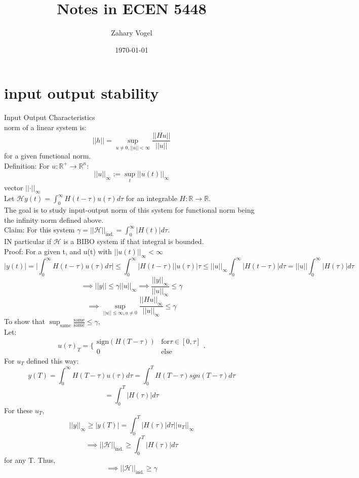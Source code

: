 \documentclass{article}
\author{Zahary Vogel}
\date{\today}
\title{Notes in ECEN 5448}
\begin{document}
\maketitle


\section{input output stability}
Input Output Characteristics\\
norm of a linear system is:\\
\[\lvert\lvert h\rvert\rvert=\sup_{u\neq 0,\lvert\lvert u\rvert\rvert<\infty}\frac{\lvert\lvert Hu\rvert\rvert}{\lvert\lvert u\rvert\rvert}\]
for a given functional norm.\\
Definition: For $u:\mathbb{R}^+\to\mathbb{R}^n$:
\[\lvert\lvert u\rvert\rvert_{\infty}:=\sup_t\lvert\lvert u(t)\rvert\rvert_{\infty}\]
vector $\lvert\lvert\cdot\rvert\rvert_{\infty}$\\
Let $\mathscr{H}$$y(t)=\int_0^{\infty}H(t-\tau)u(\tau)d\tau$ for an integrable $H:\mathbb{R}\to\mathbb{R}$.\\
The goal is to study input-output norm of this system for functional norm being the infinity norm defined above.\\
Claim: For this system $\gamma=\lvert\lvert \mathscr{H}\rvert\rvert_{\text{ind.}}=\int_0^\infty \lvert H(t)\rvert d\tau$.\\
IN particular if $\mathscr{H}$ is a BIBO system if that integral is bounded.\\

Proof: For a given t, and u(t) with $\lvert\lvert u(t)\rvert\rvert_{\infty}<\infty$
\[\lvert y(t)\rvert=\lvert\int_0^\infty H(t-\tau)u(\tau)d\tau\rvert\leq \int_0^\infty \lvert H(t-\tau)\rvert\lvert u(\tau)\rvert \tau\leq\lvert\lvert u\rvert\rvert_{\infty}\int_0^\infty \lvert H(t-\tau)\rvert d\tau =\lvert\lvert u\rvert\rvert\int_0^\infty \lvert H(\tau)\rvert d\tau\]
\[\implies \lvert\lvert y\rvert\rvert \leq \gamma\lvert\lvert u\rvert\rvert_{\infty}\implies \frac{\lvert\lvert y\rvert\rvert_{\infty}}{\lvert\lvert u\rvert\rvert_{\infty}}\leq\gamma\]
\[\implies \sup_{\lvert\lvert u\rvert\rvert\leq \infty,u\neq 0}\frac{\lvert\lvert H u\rvert\rvert_{\infty}}{\lvert\lvert u\rvert\rvert_{\infty}}\leq \gamma\]
To show that $\sup_{\text{same}}\frac{\text{same}}{\text{same}}\leq \gamma$,\\
Let:\\
\[u(\tau)_T=\{\begin{array}{ll}\text{sign}(H(T-\tau)) & \text{for} \tau\in[0,\tau]\\0 & \text{else}\end{array}.\]
For $u_T$ defined this way:\\
\[y(T)=\int_0^\infty H(T-\tau)u(\tau)d\tau=\int_0^T H(T-\tau)sgn(T-\tau)d\tau\]
\[=\int_0^T\lvert H(\tau)\rvert d\tau\]
For these $u_T$, \\
\[\lvert\lvert y\rvert\rvert_{\infty} \geq \lvert y(T)\rvert =\int_0^T\lvert H(\tau)\rvert d\tau\lvert\lvert u_T\rvert\rvert_{\infty}\]
\[\implies \lvert\lvert \mathscr{H}\rvert\rvert_{\text{ind.}}\geq \int_0^T \lvert H(\tau)\rvert d\tau\]
for any T. Thus,
\[\implies \lvert\lvert \mathscr{H}\rvert\rvert_{\text{ind.}}\geq \gamma\]
\end{document}
